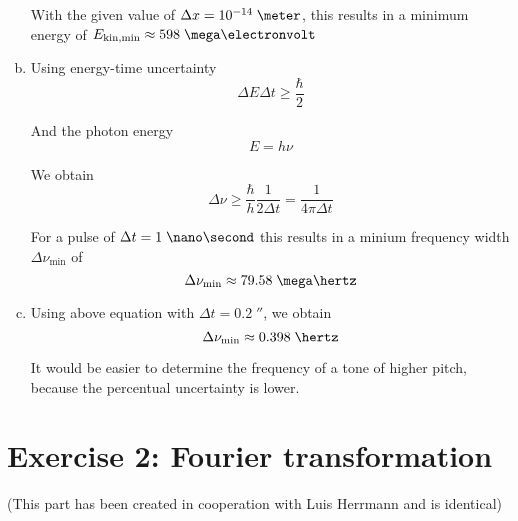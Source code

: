 \documentclass[a4paper,german,12pt,smallheadings]{scrartcl}
\begin{document}
\begin{enumerate}[a)]
    With the given value of $\Delta x = 10^{-14} \; \meter$, this results in a
    minimum energy of $E_\text{kin,min} \approx 598 \; \mega\electronvolt$

  \item
    Using energy-time uncertainty
    \begin{equation*}
      \Delta E \Delta t \ge \frac{\hbar}{2}
    \end{equation*}

    And the photon energy
    \begin{equation*}
      E = h \nu
    \end{equation*}

    We obtain
    \begin{equation*}
      \Delta \nu \ge \frac{\hbar}{h} \frac{1}{2 \Delta t} = \frac{1}{4 \pi \Delta t}
    \end{equation*}

    For a pulse of $\Delta t = 1 \; \nano\second$ this results in a minium frequency width $\Delta \nu_\text{min}$ of
    \begin{equation*}
      \Delta \nu_\text{min} \approx 79.58 \; \mega\hertz
    \end{equation*}
  \item
    Using above equation with $\Delta t = 0.2 \; \second$, we obtain
    \begin{equation*}
      \Delta \nu_\text{min} \approx 0.398 \; \hertz
    \end{equation*}

    It would be easier to determine the frequency of a tone of higher pitch,
    because the percentual uncertainty is lower.
\end{enumerate}


\section*{Exercise 2: Fourier transformation}
(This part has been created in cooperation with Luis Herrmann and is identical)
\end{document}
